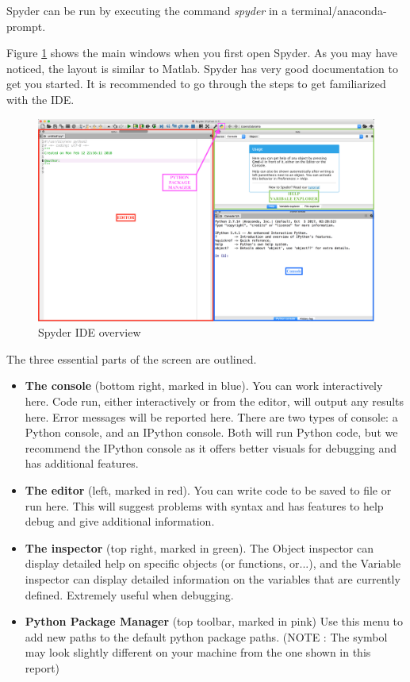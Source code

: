 \documentclass{cmc}
\begin{document}
Spyder can be run by executing the command \textit{spyder} in a
terminal/anaconda-prompt.

Figure \ref{fig:spyder} shows the main windows when you first open Spyder. As
you may have noticed, the layout is similar to Matlab. Spyder has very good
documentation to get you started.  It is recommended to go through the steps to
get familiarized with the IDE.

\begin{figure}[h]
  \centering \includegraphics[width = \textwidth]{figures/Spyder.png}
  \caption{Spyder IDE overview}
  \label{fig:spyder}
\end{figure}

The three essential parts of the screen are outlined.

\begin{itemize}
\item \textbf{The console} (bottom right, marked in blue). You can work
  interactively here. Code run, either interactively or from the editor, will
  output any results here.  Error messages will be reported here. There are two
  types of console: a Python console, and an IPython console. Both will run
  Python code, but we recommend the IPython console as it offers better visuals
  for debugging and has additional features.
\item \textbf{The editor} (left, marked in red). You can write code to be saved
  to file or run here. This will suggest problems with syntax and has features
  to help debug and give additional information.
\item \textbf{The inspector} (top right, marked in green). The Object inspector
  can display detailed help on specific objects (or functions, or...), and the
  Variable inspector can display detailed information on the variables that are
  currently defined. Extremely useful when debugging.
\item \textbf{Python Package Manager} (top toolbar, marked in pink) Use this
  menu to add new paths to the default python package paths. (NOTE : The symbol
  may look slightly different on your machine from the one shown in this report)
\end{itemize}
\end{document}
